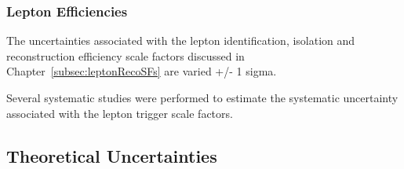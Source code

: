 \subsubsection{Lepton Efficiencies}
The uncertainties associated with the lepton identification, isolation and reconstruction efficiency scale factors discussed in Chapter~\ref{subsec:leptonRecoSFs} are varied +/- 1 sigma.

Several systematic studies were performed to estimate the systematic uncertainty associated with the lepton trigger scale factors. 

%
%

\subsection{Theoretical Uncertainties}\label{sec:theorySysts}

